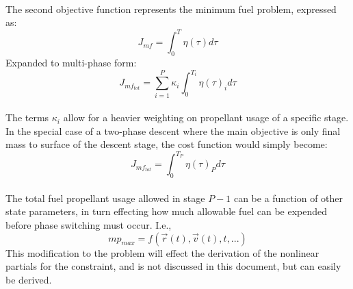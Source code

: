 \paragraph{}
The second objective function represents the minimum fuel problem, expressed as:
\begin{equation}
J_{mf} = \int_{0}^{T} \eta(\tau) d\tau
\end{equation}
Expanded to multi-phase form:
\begin{equation}
J_{mf_{tot}} = \sum_{i=1}^{P} \kappa_i \int_{0}^{T_i} \eta(\tau)_i d\tau
\end{equation}
\paragraph{}
The terms $\kappa_i$ allow for a heavier weighting on propellant usage of a specific stage. In the special case of a two-phase descent where the main objective is only final mass to surface of the descent stage, the cost function would simply become:
\begin{equation}
J_{mf_{tot}} = \int_{0}^{T_P} \eta(\tau)_P d\tau
\end{equation}
\paragraph{}
The total fuel propellant usage allowed in stage $P-1$ can be a function of other state parameters, in turn effecting how much allowable fuel can be expended before phase switching must occur. I.e.,
\begin{equation}
mp_{max} = f(\vec{r}(t), \vec{v}(t), t, ... )
\end{equation}
This modification to the problem will effect the derivation of the nonlinear partials for the constraint, and is not discussed in this document, but can easily be derived.

























